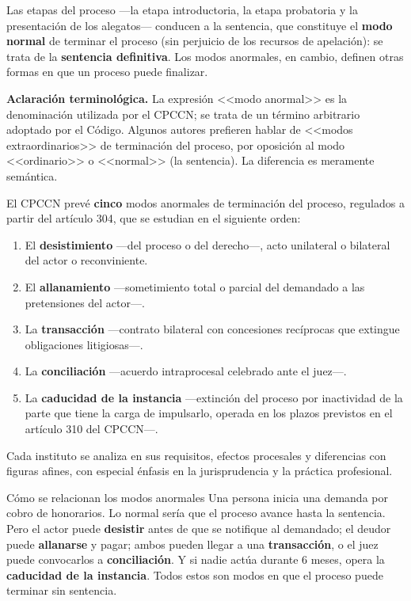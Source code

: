 \documentclass[12pt,oneside]{book}
\begin{document}
Las etapas del proceso ---la etapa introductoria, la etapa probatoria y la presentación de los alegatos--- conducen a la sentencia, que constituye el \textbf{modo normal} de terminar el proceso (sin perjuicio de los recursos de apelación): se trata de la \textbf{sentencia definitiva}. Los modos anormales, en cambio, definen otras formas en que un proceso puede finalizar.

\begin{note}
\textbf{Aclaración terminológica.} La expresión <<modo anormal>> es la denominación utilizada por el CPCCN; se trata de un término arbitrario adoptado por el Código. Algunos autores prefieren hablar de <<modos extraordinarios>> de terminación del proceso, por oposición al modo <<ordinario>> o <<normal>> (la sentencia). La diferencia es meramente semántica.
\end{note}

El CPCCN prevé \textbf{cinco} modos anormales de terminación del proceso, regulados a partir del artículo 304, que se estudian en el siguiente orden:

\begin{enumerate}
    \item El \textbf{desistimiento} ---del proceso o del derecho---, acto unilateral o bilateral del actor o reconviniente.
    \item El \textbf{allanamiento} ---sometimiento total o parcial del demandado a las pretensiones del actor---.
    \item La \textbf{transacción} ---contrato bilateral con concesiones recíprocas que extingue obligaciones litigiosas---.
    \item La \textbf{conciliación} ---acuerdo intraprocesal celebrado ante el juez---.
    \item La \textbf{caducidad de la instancia} ---extinción del proceso por inactividad de la parte que tiene la carga de impulsarlo, operada en los plazos previstos en el artículo 310 del CPCCN---.
\end{enumerate}

Cada instituto se analiza en sus requisitos, efectos procesales y diferencias con figuras afines, con especial énfasis en la jurisprudencia y la práctica profesional.

\begin{example}{Cómo se relacionan los modos anormales}
Una persona inicia una demanda por cobro de honorarios. Lo normal sería que el proceso avance hasta la sentencia. Pero el actor puede \textbf{desistir} antes de que se notifique al demandado; el deudor puede \textbf{allanarse} y pagar; ambos pueden llegar a una \textbf{transacción}, o el juez puede convocarlos a \textbf{conciliación}. Y si nadie actúa durante 6 meses, opera la \textbf{caducidad de la instancia}. Todos estos son modos en que el proceso puede terminar sin sentencia.
\end{example}
\end{document}
